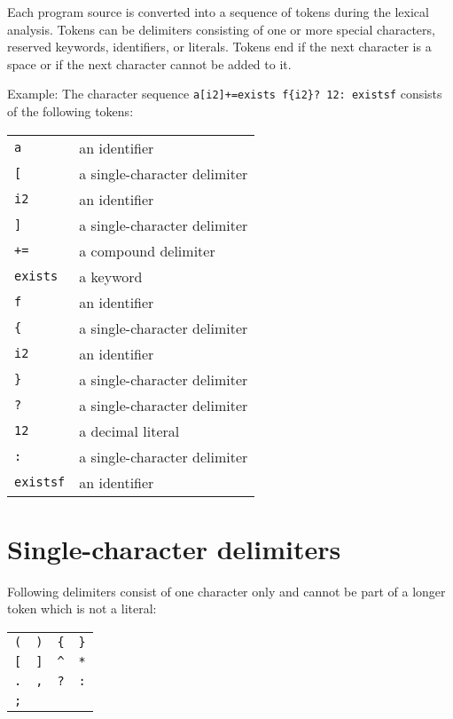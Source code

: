 Each program source is converted into a sequence of tokens during
the lexical analysis. Tokens can be
delimiters consisting of one or more special
characters, reserved keywords,
identifiers, or literals. Tokens end if
the next character is a space or if the next character cannot be added
to it.

Example: The character sequence \lstinline!a[i2]+=exists f{i2}? 12: existsf!
consists of the following tokens:

\begin{tabular}{l l}
   \lstinline!a! & an identifier \\
   \lstinline![! & a single-character delimiter \\
   \lstinline!i2! & an identifier \\
   \lstinline!]! & a single-character delimiter \\
   \lstinline!+=! & a compound delimiter \\
   \lstinline!exists! & a keyword \\
   \lstinline!f! & an identifier \\
   \lstinline!{! & a single-character delimiter \\
   \lstinline!i2! & an identifier \\
   \lstinline!}! & a single-character delimiter \\
   \lstinline!?! & a single-character delimiter \\
   \lstinline!12! & a decimal literal \\
   \lstinline!:! & a single-character delimiter \\
   \lstinline!existsf! & an identifier \\
\end{tabular}

\section{Single-character delimiters}

Following delimiters consist of one character only and cannot
be part of a longer token which is not a literal:

\bigskip
\noindent
\begin{tabular}{l l l l}
   \lstinline!(! & \lstinline!)! & \lstinline!{! & \lstinline!}! \\
   \lstinline![! & \lstinline!]! & \lstinline!^! & \lstinline!*! \\
   \lstinline!.! & \lstinline!,! & \lstinline!?! & \lstinline!:! \\
   \lstinline!;! \\
\end{tabular}

